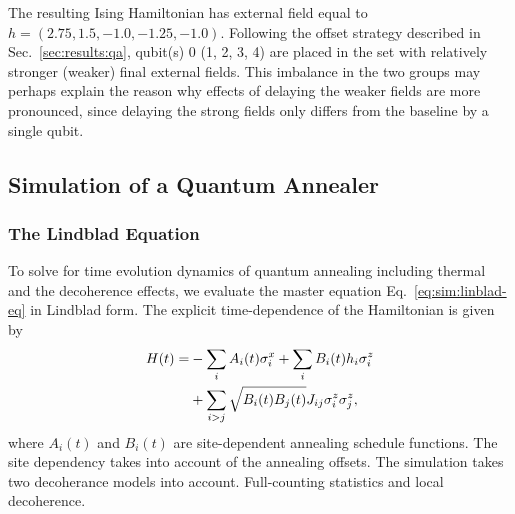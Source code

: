 \documentclass[prd,twocolumn,tightenlines,preprintnumbers,showpacs,superscriptaddress,notitlepage,nofootinbib,eqsecnum,floatfix,longbibliography,aps,10pt]{revtex4-1}
\begin{document}
The resulting Ising Hamiltonian has external field equal to $h = (2.75, 1.5, -1.0, -1.25, -1.0)$.
Following the offset strategy described in Sec.~\ref{sec:results:qa}, qubit(s) 0 (1, 2, 3, 4) are placed in the set with relatively stronger (weaker) final external fields.
This imbalance in the two groups may perhaps explain the reason why effects of delaying the weaker fields are more pronounced, since delaying the strong fields only differs from the baseline by a single qubit.



\subsection{Simulation of a Quantum Annealer}
\label{sec:methods:simulation}

\subsubsection{The Lindblad Equation}
\label{sec:methods:lindblad}

To solve for time evolution dynamics of quantum annealing including thermal and the decoherence effects, we evaluate the master equation Eq.~\eqref{eq:sim:linblad-eq} in Lindblad form.
The explicit time-dependence of the Hamiltonian is given by
\begin{align}
 \label{eq:annealH}
 H(t)  = & - \sum_i  A_i(t)\sigma^x_i +\sum_i B_{i}(t) h_i \sigma^z_i \notag \\
 & + \sum_{i>j} \sqrt{B_{i}(t)B_{j}(t)} J_{ij} \sigma^z_i \sigma^z_j  ,
\end{align}
where $A_i(t)$ and $B_{i}(t)$ are site-dependent annealing schedule functions.
The site dependency takes into account of the annealing offsets.
The simulation takes two decoherance models into account.
Full-counting statistics and local decoherence.
\end{document}
